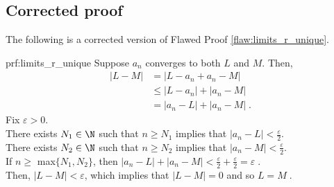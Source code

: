\clearpage
\subsection{Corrected proof}

The following is a corrected version of Flawed Proof \ref{flaw:limits_r_unique}. %

\begin{prf}{prf:limits_r_unique} %
Suppose $a_n$ converges to both $L$ and $M.$ Then,
\begin{align*}
    |L - M | &= |L - a_n + a_n -M | \\
    &\leq |L-a_n| + |a_n-M| \\
    &= |a_n -L| + |a_n-M|\;.
\end{align*}
Fix $\varepsilon > 0.$ \\
There exists $N_1 \in \N$ such that $n \geq N_1$ implies that $|a_n - L| < \frac{\varepsilon}{2}.$ \\
There exists $N_2 \in \N$ such that $n \geq N_2$ implies that $|a_n - M| < \frac{\varepsilon}{2}.$ \\
If $n \geq$ max$\{N_1, N_2\}$, then $|a_n -L| + |a_n-M| < \frac{\varepsilon}{2} + \frac{\varepsilon}{2} = \varepsilon\;.$ \\
Then, $|L-M| < \varepsilon$, which implies that $|L-M| = 0$ and so $L=M\;.$
\end{prf}
